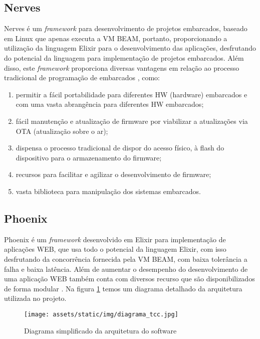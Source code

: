 \documentclass[../../layout.tex]{subfiles}
\begin{document}
\subsection{Nerves}
\hspace*{3em}Nerves é um \emph{framework} para desenvolvimento de projetos embarcados, baseado em Linux que apenas executa a VM BEAM, portanto, proporcionando a utilização da linguagem Elixir para o desenvolvimento das aplicações,  desfrutando do potencial da linguagem para implementação de projetos embarcados. Além disso, este \emph{framework} proporciona diversas vantagens em relação ao processo tradicional de programação de embarcados \cite{nerves}, como:

\begin{enumerate}[label=\alph*)]
\itemsep0em
    \item permitir a fácil portabilidade para diferentes HW (hardware) embarcados e com uma vasta abrangência para diferentes HW embarcados;
    \item fácil manutenção e atualização de firmware por viabilizar a atualizações via OTA (atualização sobre o ar);
    \item dispensa o processo tradicional de dispor do acesso físico, à flash do dispositivo para o armazenamento do firmware;
    \item recursos para facilitar e agilizar o desenvolvimento de firmware;
    \item vasta biblioteca para manipulação dos sistemas embarcados.
\end{enumerate}

\subsection{Phoenix}

\hspace*{3em}Phoenix é um \emph{framework} desenvolvido em Elixir para implementação de aplicações WEB, que usa todo o potencial da linguagem Elixir, com isso desfrutando da concorrência fornecida pela VM BEAM, com baixa tolerância a falha e baixa latência.  Além de aumentar o desempenho do desenvolvimento de uma aplicação WEB também conta com diversos recurso que são disponibilizados de forma modular \cite{phoenix}. Na figura \ref{fig:diagrama_sw} temos um diagrama detalhado da arquitetura utilizada no projeto.

\begin{figure}[H]
\centering
\caption{Diagrama simplificado da arquitetura do software}
\texttt{[image: assets/static/img/diagrama\_tcc.jpg]}
\label{fig:diagrama_sw}
\end{figure}
\end{document}
